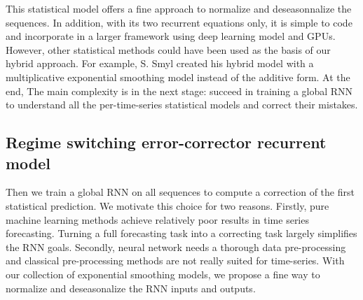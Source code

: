 \documentclass[letterpaper]{article} %
\begin{document}

This statistical model offers a fine approach to normalize and deseasonnalize the sequences. In addition, with its two recurrent equations only, it is simple to code and incorporate in a larger framework using deep learning model and GPUs. However, other statistical methods could have been used as the basis of our hybrid approach. For example, S. Smyl created his hybrid model with a multiplicative exponential smoothing model instead of the additive form. At the end, The main complexity is in the next stage: succeed in training a global RNN to understand all the per-time-series statistical models and correct their mistakes.

\subsection{Regime switching error-corrector recurrent model}

Then we train a global RNN on all sequences to compute a correction of the first statistical prediction. We motivate this choice for two reasons. Firstly, pure machine learning methods achieve relatively poor results in time series forecasting. Turning a full forecasting task into a correcting task largely simplifies the RNN goals. Secondly, neural network needs a thorough data pre-processing and classical pre-processing methods are not really suited for time-series. With our collection of exponential smoothing models, we propose a fine way to normalize and deseasonalize the RNN inputs and outputs. %
\end{document}
